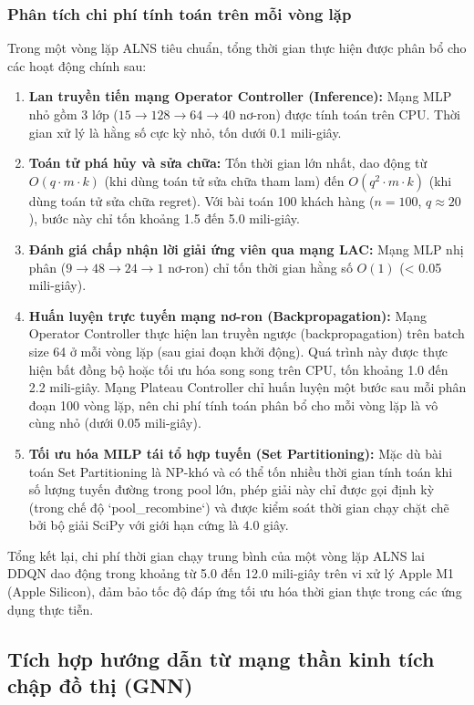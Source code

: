 \documentclass[13pt,a4paper]{extarticle}
\begin{document}
\subsubsection{Phân tích chi phí tính toán trên mỗi vòng lặp}
Trong một vòng lặp ALNS tiêu chuẩn, tổng thời gian thực hiện được phân bổ cho các hoạt động chính sau:
\begin{enumerate}[leftmargin=1.2cm]
  \item \textbf{Lan truyền tiến mạng Operator Controller (Inference):} Mạng MLP nhỏ gồm 3 lớp ($15 \to 128 \to 64 \to 40$ nơ-ron) được tính toán trên CPU. Thời gian xử lý là hằng số cực kỳ nhỏ, tốn dưới 0.1 mili-giây.
  \item \textbf{Toán tử phá hủy và sửa chữa:} Tốn thời gian lớn nhất, dao động từ $O(q \cdot m \cdot k)$ (khi dùng toán tử sửa chữa tham lam) đến $O(q^2 \cdot m \cdot k)$ (khi dùng toán tử sửa chữa regret). Với bài toán 100 khách hàng ($n=100$, $q \approx 20$), bước này chỉ tốn khoảng 1.5 đến 5.0 mili-giây.
  \item \textbf{Đánh giá chấp nhận lời giải ứng viên qua mạng LAC:} Mạng MLP nhị phân ($9 \to 48 \to 24 \to 1$ nơ-ron) chỉ tốn thời gian hằng số $O(1)$ (< 0.05 mili-giây).
  \item \textbf{Huấn luyện trực tuyến mạng nơ-ron (Backpropagation):} Mạng Operator Controller thực hiện lan truyền ngược (backpropagation) trên batch size 64 ở mỗi vòng lặp (sau giai đoạn khởi động). Quá trình này được thực hiện bất đồng bộ hoặc tối ưu hóa song song trên CPU, tốn khoảng 1.0 đến 2.2 mili-giây. Mạng Plateau Controller chỉ huấn luyện một bước sau mỗi phân đoạn 100 vòng lặp, nên chi phí tính toán phân bổ cho mỗi vòng lặp là vô cùng nhỏ (dưới 0.05 mili-giây).
  \item \textbf{Tối ưu hóa MILP tái tổ hợp tuyến (Set Partitioning):} Mặc dù bài toán Set Partitioning là NP-khó và có thể tốn nhiều thời gian tính toán khi số lượng tuyến đường trong pool lớn, phép giải này chỉ được gọi định kỳ (trong chế độ `pool\_recombine`) và được kiểm soát thời gian chạy chặt chẽ bởi bộ giải SciPy với giới hạn cứng là $4.0$ giây.
\end{enumerate}

Tổng kết lại, chi phí thời gian chạy trung bình của một vòng lặp ALNS lai DDQN dao động trong khoảng từ 5.0 đến 12.0 mili-giây trên vi xử lý Apple M1 (Apple Silicon), đảm bảo tốc độ đáp ứng tối ưu hóa thời gian thực trong các ứng dụng thực tiễn.

\subsection{Tích hợp hướng dẫn từ mạng thần kinh tích chập đồ thị (GNN)}
\label{sec:gnn_guidance}
\end{document}
